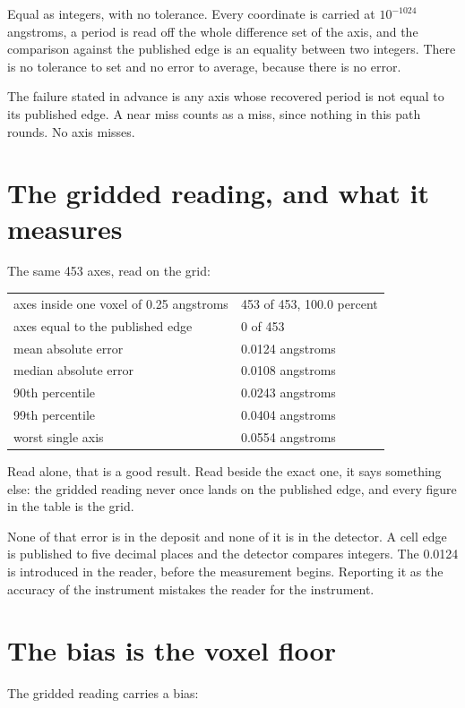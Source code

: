 Equal as integers, with no tolerance. Every coordinate is carried at $10^{-1024}$ angstroms, a period is read off the whole difference set of the axis, and the comparison against the published edge is an equality between two integers. There is no tolerance to set and no error to average, because there is no error.

The failure stated in advance is any axis whose recovered period is not equal to its published edge. A near miss counts as a miss, since nothing in this path rounds. No axis misses.

\section{The gridded reading, and what it measures}

The same 453 axes, read on the grid:

\begin{longtable}{@{}p{}p{}@{}}
\toprule
\endhead
axes inside one voxel of 0.25 angstroms & 453 of 453, 100.0 percent \\
axes equal to the published edge & 0 of 453 \\
mean absolute error & 0.0124 angstroms \\
median absolute error & 0.0108 angstroms \\
90th percentile & 0.0243 angstroms \\
99th percentile & 0.0404 angstroms \\
worst single axis & 0.0554 angstroms \\
\bottomrule
\end{longtable}

Read alone, that is a good result. Read beside the exact one, it says something else: the gridded reading never once lands on the published edge, and every figure in the table is the grid.

None of that error is in the deposit and none of it is in the detector. A cell edge is published to five decimal places and the detector compares integers. The 0.0124 is introduced in the reader, before the measurement begins. Reporting it as the accuracy of the instrument mistakes the reader for the instrument.

\section{The bias is the voxel floor}

The gridded reading carries a bias:

